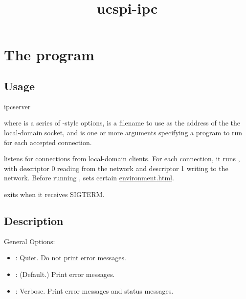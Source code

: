 \documentclass{book}
\title{ucspi-ipc}
\begin{document}
\section{The  program}

\subsection{Usage}
\begin{code}%
  ipcserver   
\end{code}
where  is a series of -style options,
 is a filename to use as the address of the the
local-domain socket, and  is one or more arguments
specifying a program to run for each accepted connection.

 listens for connections from local-domain clients.
For each connection, it runs , with descriptor 0 reading
from the network and descriptor 1 writing to the network.  Before
running ,  sets certain
\href{environment variables}{environment.html}.

 exits when it receives SIGTERM.

\subsection{Description}
General Options:
\begin{itemize}
\item {}: Quiet.  Do not print error messages.
\item {}: (Default.)  Print error messages.
\item {}: Verbose.  Print error messages and status messages.
\end{itemize}
\end{document}
